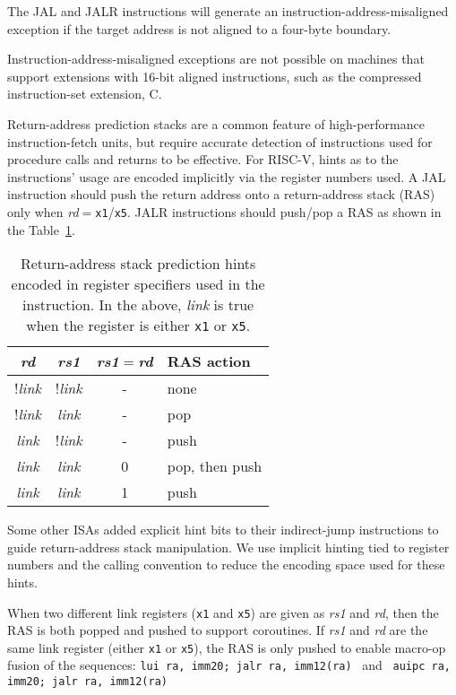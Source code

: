 The JAL and JALR instructions will generate an
instruction-address-misaligned exception if the target address is not
aligned to a four-byte boundary.

\begin{commentary}
Instruction-address-misaligned exceptions are not possible on machines
that support extensions with 16-bit aligned instructions, such as the
compressed instruction-set extension, C.
\end{commentary}

Return-address prediction stacks are a common feature of
high-performance instruction-fetch units, but require accurate
detection of instructions used for procedure calls and returns to be
effective.  For RISC-V, hints as to the instructions' usage are encoded
implicitly via the register numbers used.  A JAL instruction should
push the return address onto a return-address stack (RAS) only when
{\em rd}$=${\tt x1}/{\tt x5}.  JALR instructions should push/pop a
RAS as shown in the Table~\ref{rashints}.
\begin{table}[hbt]
\centering
\begin{tabular}{|c|c|c|l|}
  \hline
  \em rd & \em rs1 & {\em rs1}$=${\em rd} & RAS action \\
  \hline
  !{\em link} & !{\em link} & - & none \\
  !{\em link} &  {\em link} & - & pop \\
   {\em link} & !{\em link} & - & push  \\
   {\em link} &  {\em link} & 0 & pop, then push \\
   {\em link} &  {\em link} & 1 & push \\
   \hline
\end{tabular}
\caption{Return-address stack prediction hints encoded in register
  specifiers used in the instruction.  In the above, {\em link} is
  true when the register is either {\tt x1} or {\tt x5}.}
\label{rashints}
\end{table}

\begin{commentary}
Some other ISAs added explicit hint bits to their indirect-jump instructions
to guide return-address stack manipulation.  We use implicit hinting tied to
register numbers and the calling convention to reduce the encoding space used
for these hints.

When two different link registers ({\tt x1} and {\tt x5}) are given as
{\em rs1} and {\em rd}, then the RAS is both popped and pushed to
support coroutines.  If {\em rs1} and {\em rd} are the same link
register (either {\tt x1} or {\tt x5}), the RAS is only pushed to
enable macro-op fusion of the sequences:\linebreak
{\tt lui ra, imm20; jalr ra, imm12(ra)} \ and \ 
{\tt auipc ra, imm20; jalr ra, imm12(ra)}
\end{commentary}

